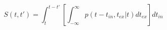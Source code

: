 \begin{equation}
S(t,t') = \int_{t}^{t-t'} \left[ \int_{-\infty}^\infty p(t-t_{in},t_{ex}|t) dt_{ex}\right] dt_{in}
\end{equation}